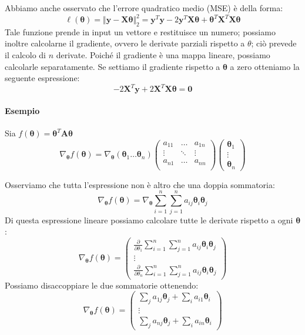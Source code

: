 \documentclass{article}
\begin{document}
            Abbiamo anche osservato che l'errore quadratico medio (MSE) è della forma:
            \[\ell(\mathbf{\theta}) = \Vert \mathbf{y} - \mathbf{X\theta} \Vert_2^2 = \mathbf{y}^T\mathbf{y} - 2\mathbf{y}^T\mathbf{X\theta} + \mathbf{\theta}^T\mathbf{X}^T\mathbf{X\theta}\]
            Tale funzione prende in input un vettore e restituisce un numero; possiamo inoltre calcolarne il gradiente, ovvero le derivate parziali
            rispetto a $\theta$; ciò prevede il calcolo di $n$ derivate. Poiché il gradiente è una mappa lineare, possiamo calcolarle
            separatamente. Se settiamo il gradiente rispetto a $\mathbf{\theta}$ a zero otteniamo la seguente espressione:
            \[-2\mathbf{X}^T\mathbf{y} + 2\mathbf{X}^T\mathbf{X\theta} = \mathbf{0}\]
            \paragraph{Esempio} Sia $f(\mathbf{\theta}) = \mathbf{\theta}^T\mathbf{A\theta}$
            \[\nabla_\mathbf{\theta}f(\mathbf{\theta}) = \nabla_\mathbf{\theta}(\mathbf{\theta}_1 \dots \mathbf{\theta}_n) \begin{pmatrix}
                a_{11} & \dots & a_{1n} \\
                \vdots & \ddots &\vdots \\
                a_{n1} & \dots & a_{nn} \\
            \end{pmatrix} \begin{pmatrix}
                \mathbf{\theta}_1 \\
                \vdots \\
                \mathbf{\theta}_n 
            \end{pmatrix}\]

            Osserviamo che tutta l'espressione non è altro che una doppia sommatoria:
            \[\nabla_\mathbf{\theta}f(\mathbf{\theta}) = \nabla_\mathbf{\theta}\sum_{i=1}^n\sum_{j=1}^na_{ij}\mathbf{\theta}_i\mathbf{\theta}_j\]
            Di questa espressione lineare possiamo calcolare tutte le derivate rispetto a ogni $\mathbf{\theta}$:
            \[\nabla_\mathbf{\theta}f(\mathbf{\theta}) = \begin{pmatrix}
                \frac{\partial}{\partial \theta_1}\sum_{i=1}^n\sum_{j=1}^n a_{ij}\mathbf{\theta}_i\mathbf{\theta}_j \\
                \vdots \\
                \frac{\partial}{\partial \theta_n}\sum_{i=1}^n\sum_{j=1}^n a_{ij}\mathbf{\theta}_i\mathbf{\theta}_j
            \end{pmatrix}\]
            Possiamo disaccoppiare le due sommatorie ottenendo:
            \[\nabla_\mathbf{\theta}f(\mathbf{\theta}) = \begin{pmatrix}
                \sum_j a_{1j}\mathbf{\theta}_j + \sum_i a_{i1} \mathbf{\theta}_i \\
                \vdots \\
                \sum_j a_{nj}\mathbf{\theta}_j + \sum_i a_{in} \mathbf{\theta}_i
            \end{pmatrix}\]
\end{document}
